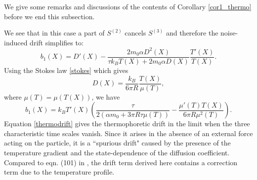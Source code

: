We give some remarks and discussions of the contents of Corollary \ref{cor1_thermo} before we end this subsection.   

\begin{remark}
We see that in this case a part of $S^{(2)}$ cancels $S^{(3)}$ and therefore the noise-induced drift simplifies to:
\begin{equation} \label{thermodrift}
b_{1}(X) = D'(X)-\frac{2m_{0}\alpha D^2(X)}{\tau k_{B}T(X)+2m_{0}\alpha D(X)}\frac{T'(X)}{T(X)}.
\end{equation}
Using the Stokes law \eqref{stokes} which gives \begin{equation}D(X) = \frac{k_{B}}{6 \pi R} \frac{T(X)}{\mu(T)}, \end{equation} 
where $\mu(T) = \mu(T(X))$, we have
\begin{equation} \label{thermodrift2}
b_{1}(X) = k_{B} T'(X) \left( \frac{\tau}{2(\alpha m_{0} + 3 \pi R \tau \mu(T))} - \frac{\mu'(T) T(X)}{6 \pi R \mu^2(T)} \right).
 \end{equation}
Equation  \eqref{thermodrift} gives the thermophoretic drift in the limit when the three characteristic time scales vanish. Since it arises in the absence of an external force acting on the particle, it is a ``spurious drift" caused by the presence of the temperature gradient and the state-dependence of the diffusion coefficient. Compared to eqn. (101) in \cite{hottovy2015smoluchowski}, the drift term derived here contains a correction term due to the temperature profile.   
\end{remark}

